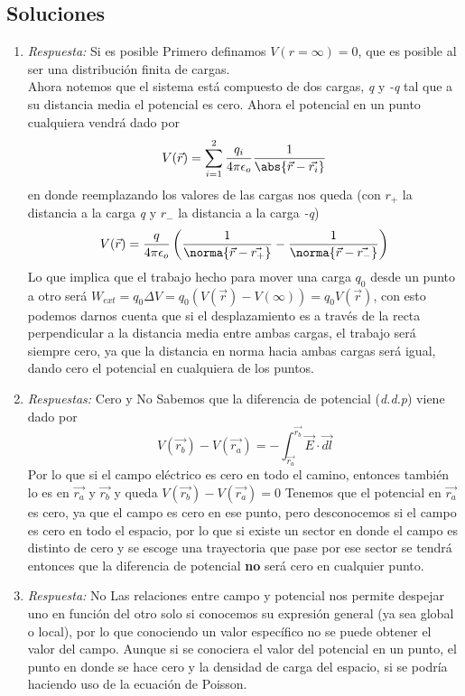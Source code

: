 \subsection{Soluciones}


\begin{enumerate}[label=\alph*)]
    \item \textit{Respuesta:} Si es posible \newline Primero definamos $V(r = \infty)=0$, que es posible al ser una distribución finita de cargas. \\ Ahora notemos que el sistema está compuesto de dos cargas, \textit{q} y \textit{-q} tal que a su distancia media el potencial es cero. Ahora el potencial en un punto cualquiera vendrá dado por \[V(\Vec{r})=\sum_{i=1}^2\frac{q_i}{4\pi\epsilon_o}\frac{1}{\abs{\Vec{r}-\Vec{r_i}}}\] en donde reemplazando los valores de las cargas nos queda (con $r_+$ la distancia a la carga \textit{q} y $r_{-}$ la distancia a la carga \textit{-q}) \[V(\Vec{r})=\frac{q}{4\pi\epsilon_o}\left(\frac{1}{\norma{\Vec{r} - \Vec{r_+}}} - \frac{1}{\norma{\Vec{r} - \Vec{r_{-}}}} \right)\]
    Lo que implica que el trabajo hecho para mover una carga $q_0$ desde un punto a otro será $W_{ext} = q_0 \Delta V = q_0(V(\Vec{r})-V(\infty)) = q_0V(\Vec{r})$, con esto podemos darnos cuenta que si el desplazamiento es a través de la recta perpendicular a la distancia media entre ambas cargas, el trabajo será siempre cero, ya que la distancia en norma hacia ambas cargas será igual, dando cero el potencial en cualquiera de los puntos. 
    
    \item \textit{Respuestas:} Cero y No \newline Sabemos que la diferencia de potencial (\textit{d.d.p}) viene dado por \[V(\Vec{r_b}) - V(\Vec{r_a}) = - \int_{\Vec{r_a}}^{\Vec{r_b}}\Vec{E}\cdot\Vec{dl}\]
    Por lo que si el campo eléctrico es cero en todo el camino, entonces también lo es en $\Vec{r_a}$ y $\Vec{r_b}$ y queda $V(\Vec{r_b}) - V(\Vec{r_a}) = 0$ \newline Tenemos que el potencial en $\Vec{r_a}$ es cero, ya que el campo es cero en ese punto, pero desconocemos si el campo es cero en todo el espacio, por lo que si existe un sector en donde el campo es distinto de cero y se escoge una trayectoria que pase por ese sector se tendrá entonces que la diferencia de potencial \textbf{no} será cero en cualquier punto.
    
    \item \textit{Respuesta:} No \newline Las relaciones entre campo y potencial nos permite despejar uno en función del otro solo si conocemos su expresión general (ya sea global o local), por lo que conociendo un valor específico no se puede obtener el valor del campo. Aunque si se conociera el valor del potencial en un punto, el punto en donde se hace cero y la densidad de carga del espacio, si se podría haciendo uso de la ecuación de Poisson.

\end{enumerate}
